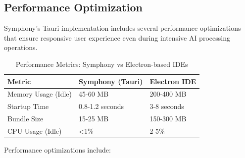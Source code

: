 \subsection*{Performance Optimization}

Symphony's Tauri implementation includes several performance optimizations that ensure responsive user experience even during intensive AI processing operations.

\begin{table}[h]
\centering
\caption{Performance Metrics: Symphony vs Electron-based IDEs}
\begin{tabular}{@{}lll@{}}
\toprule
\textbf{Metric} & \textbf{Symphony (Tauri)} & \textbf{Electron IDE} \\
\midrule
Memory Usage (Idle) & 45-60 MB & 200-400 MB \\
Startup Time & 0.8-1.2 seconds & 3-8 seconds \\
Bundle Size & 15-25 MB & 150-300 MB \\
CPU Usage (Idle) & <1\% & 2-5\% \\
\bottomrule
\end{tabular}
\end{table}

Performance optimizations include:

